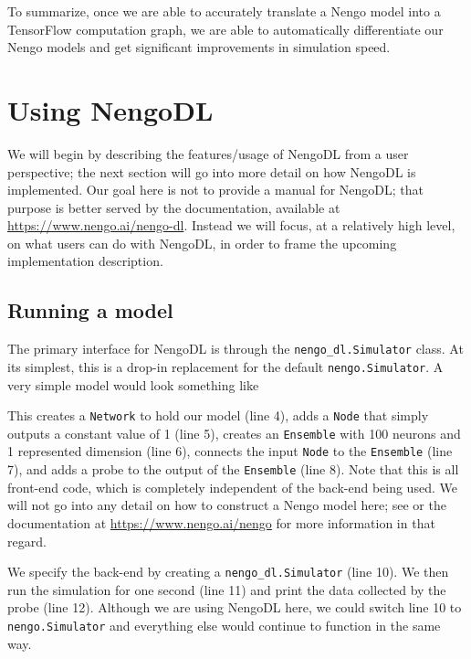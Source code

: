 \documentclass{article}
\begin{document}
To summarize, once we are able to accurately translate a Nengo model into a TensorFlow computation graph, we are able to automatically differentiate our Nengo models and get significant improvements in simulation speed.

\section{Using NengoDL}

We will begin by describing the features/usage of NengoDL from a user perspective; the next section will go into more detail on how NengoDL is implemented.  Our goal here is not to provide a manual for NengoDL; that purpose is better served by the documentation, available at \url{https://www.nengo.ai/nengo-dl}.  Instead we will focus, at a relatively high level, on what users can do with NengoDL, in order to frame the upcoming implementation description.

\subsection{Running a model}

The primary interface for NengoDL is through the \texttt{nengo\_dl.Simulator} class.  At its simplest, this is a drop-in replacement for the default \texttt{nengo.Simulator}.  A very simple model would look something like

\lstset{language=Python, numbers=left, columns=fixed, basicstyle=\ttfamily}


This creates a \texttt{Network} to hold our model (line 4), adds a \texttt{Node} that simply outputs a constant value of 1 (line 5), creates an \texttt{Ensemble} with 100 neurons and 1 represented dimension (line 6), connects the input \texttt{Node} to the \texttt{Ensemble} (line 7), and adds a probe to the output of the \texttt{Ensemble} (line 8).  Note that this is all front-end code, which is completely independent of the back-end being used.  We will not go into any detail on how to construct a Nengo model here; see \citet{Bekolay2014} or the documentation at \url{https://www.nengo.ai/nengo} for more information in that regard.

We specify the back-end by creating a \texttt{nengo\_dl.Simulator} (line 10).  We then run the simulation for one second (line 11) and print the data collected by the probe (line 12).  Although we are using NengoDL here, we could switch line 10 to \texttt{nengo.Simulator} and everything else would continue to function in the same way.
\end{document}
